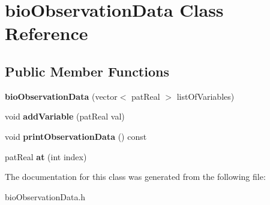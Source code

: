 \hypertarget{classbio_observation_data}{}\section{bio\+Observation\+Data Class Reference}
\label{classbio_observation_data}
\subsection*{Public Member Functions}
\begin{DoxyCompactItemize}
\item 
\mbox{\label{classbio_observation_data_a45e676dc27d8aa3e7083745bbd4bbc85}} 
{\bfseries bio\+Observation\+Data} (vector$<$ pat\+Real $>$ list\+Of\+Variables)
\item 
\mbox{\label{classbio_observation_data_a370ad2d6ab5b5db7ded910d547d37d4d}} 
void {\bfseries add\+Variable} (pat\+Real val)
\item 
\mbox{\label{classbio_observation_data_ab0d47b36eaaa0392e4139d0e6c4b77a8}} 
void {\bfseries print\+Observation\+Data} () const
\item 
\mbox{\label{classbio_observation_data_a54bebc277edab4cf83586ba37e894996}} 
pat\+Real {\bfseries at} (int index)
\end{DoxyCompactItemize}


The documentation for this class was generated from the following file\+:\begin{DoxyCompactItemize}
\item 
bio\+Observation\+Data.\+h\end{DoxyCompactItemize}
